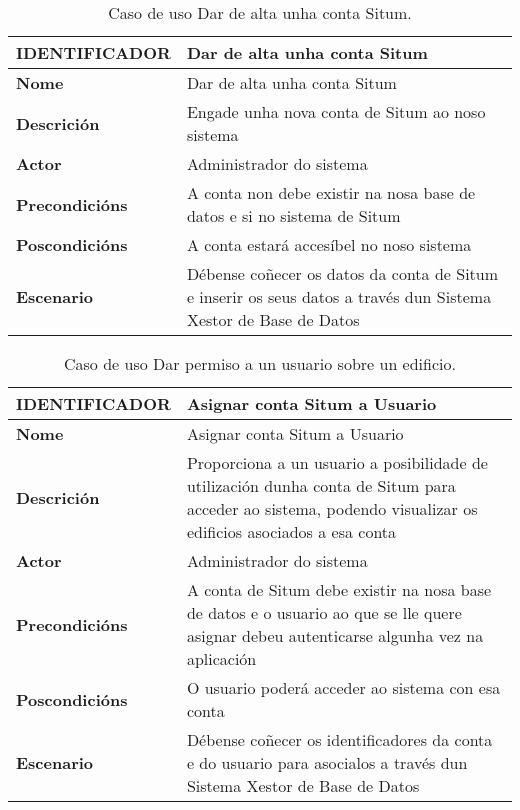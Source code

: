 \begin{table}[tbh]
	\begin{tabular}{|l|p{10cm}|}
		\hline 
		\textbf{IDENTIFICADOR}	& \textbf{Dar de alta unha conta Situm} \\ 
		\hline 
		\textbf{Nome} & Dar de alta unha conta Situm \\ 
		\hline 
		\textbf{Descrición} & Engade unha nova conta de Situm ao noso sistema \\ 
		\hline 
		\textbf{Actor} & Administrador do sistema \\ 
		\hline 
		\textbf{Precondicións} & A conta non debe existir na nosa base de datos e si no sistema de Situm \\ 
		\hline 
		\textbf{Poscondicións} & A conta estará accesíbel no noso sistema \\ 
		\hline 
		\textbf{Escenario} & Débense coñecer os datos da conta de Situm e inserir os seus datos a través dun Sistema Xestor de Base de Datos \\ 
		\hline 
	\end{tabular}
	\caption{Caso de uso Dar de alta unha conta Situm.}
	\label{tab:cuDarAltaContaSitum}
\end{table}

\begin{table}[tbh]
	\begin{tabular}{|l|p{10cm}|}
		\hline 
		\textbf{IDENTIFICADOR}	& \textbf{Asignar conta Situm a Usuario} \\ 
		\hline 
		\textbf{Nome} & Asignar conta Situm a Usuario \\ 
		\hline 
		\textbf{Descrición} & Proporciona a un usuario a posibilidade de utilización dunha conta de Situm para acceder ao sistema, podendo visualizar os edificios asociados a esa conta \\ 
		\hline 
		\textbf{Actor} & Administrador do sistema \\ 
		\hline 
		\textbf{Precondicións} & A conta de Situm debe existir na nosa base de datos e o usuario ao que se lle quere asignar debeu autenticarse algunha vez na aplicación \\ 
		\hline 
		\textbf{Poscondicións} & O usuario poderá acceder ao sistema con esa conta \\ 
		\hline 
		\textbf{Escenario} & Débense coñecer os identificadores da conta e do usuario para asocialos a través dun Sistema Xestor de Base de Datos \\ 
		\hline 
	\end{tabular}
	\caption{Caso de uso Dar permiso a un usuario sobre un edificio.}
	\label{tab:cuAsignarContaSitumUsuario}
\end{table}